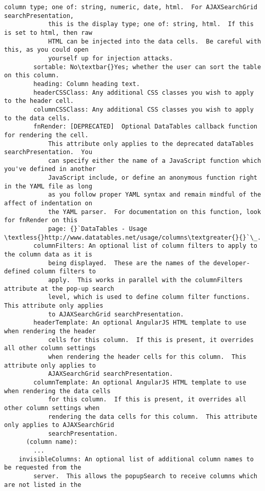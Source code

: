 \documentclass[letterpaper,10pt,english]{sphinxmanual}
\begin{document}
\begin{Verbatim}[commandchars=\\\{\}]
            column type; one of: string, numeric, date, html.  For AJAXSearchGrid searchPresentation,
            this is the display type; one of: string, html.  If this is set to html, then raw
            HTML can be injected into the data cells.  Be careful with this, as you could open
            yourself up for injection attacks.
        sortable: No\textbar{}Yes; whether the user can sort the table on this column.
        heading: Column heading text.
        headerCSSClass: Any additional CSS classes you wish to apply to the header cell.
        columnCSSClass: Any additional CSS classes you wish to apply to the data cells.
        fnRender: [DEPRECATED]  Optional DataTables callback function for rendering the cell.
            This attribute only applies to the deprecated dataTables searchPresentation.  You
            can specify either the name of a JavaScript function which you've defined in another
            JavaScript include, or define an anonymous function right in the YAML file as long
            as you follow proper YAML syntax and remain mindful of the affect of indentation on
            the YAML parser.  For documentation on this function, look for fnRender on this
            page: {}`DataTables - Usage \textless{}http://www.datatables.net/usage/columns\textgreater{}{}`\_.
        columnFilters: An optional list of column filters to apply to the column data as it is
            being displayed.  These are the names of the developer-defined column filters to
            apply.  This works in parallel with the columnFilters attribute at the pop-up search
            level, which is used to define column filter functions.  This attribute only applies
            to AJAXSearchGrid searchPresentation.
        headerTemplate: An optional AngularJS HTML template to use when rendering the header
            cells for this column.  If this is present, it overrides all other column settings
            when rendering the header cells for this column.  This attribute only applies to
            AJAXSearchGrid searchPresentation.
        columnTemplate: An optional AngularJS HTML template to use when rendering the data cells
            for this column.  If this is present, it overrides all other column settings when
            rendering the data cells for this column.  This attribute only applies to AJAXSearchGrid
            searchPresentation.
      (column name):
        ...
    invisibleColumns: An optional list of additional column names to be requested from the
        server.  This allows the popupSearch to receive columns which are not listed in the

\end{Verbatim}
\end{document}
